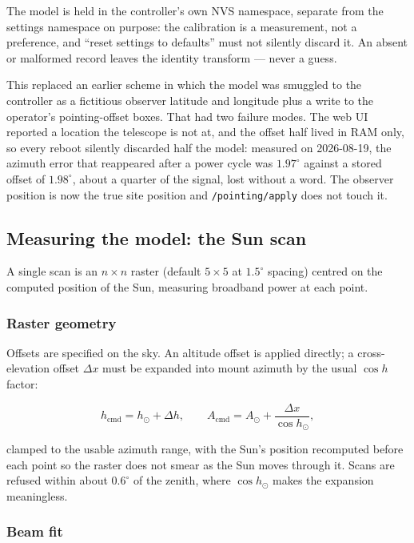 \documentclass[11pt,a4paper]{article}
\begin{document}
The model is held in the controller's own NVS namespace, separate from the settings namespace on purpose: the calibration is a measurement, not a preference, and ``reset settings to defaults'' must not silently discard it. An absent or malformed record leaves the identity transform --- never a guess.

This replaced an earlier scheme in which the model was smuggled to the controller as a fictitious observer latitude and longitude plus a write to the operator's pointing-offset boxes. That had two failure modes. The web UI reported a location the telescope is not at, and the offset half lived in RAM only, so every reboot silently discarded half the model: measured on 2026-08-19, the azimuth error that reappeared after a power cycle was $1.97^\circ$ against a stored offset of $1.98^\circ$, about a quarter of the signal, lost without a word. The observer position is now the true site position and \texttt{/pointing/apply} does not touch it.

\subsection{Measuring the model: the Sun scan}
\label{sec:sunscan}

A single scan is an $n \times n$ raster (default $5 \times 5$ at $1.5^\circ$ spacing) centred on the computed position of the Sun, measuring broadband power at each point.

\subsubsection{Raster geometry}

Offsets are specified on the sky. An altitude offset is applied directly; a cross-elevation offset $\Delta x$ must be expanded into mount azimuth by the usual $\cos h$ factor:

\begin{equation}
h_\text{cmd} = h_\odot + \Delta h,
\qquad
A_\text{cmd} = A_\odot + \frac{\Delta x}{\cos h_\odot},
\end{equation}

clamped to the usable azimuth range, with the Sun's position recomputed before each point so the raster does not smear as the Sun moves through it. Scans are refused within about $0.6^\circ$ of the zenith, where $\cos h_\odot$ makes the expansion meaningless.

\subsubsection{Beam fit}
\end{document}
